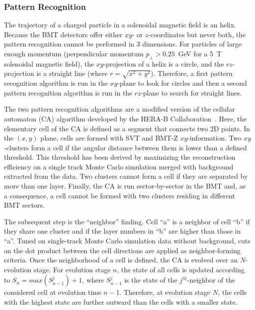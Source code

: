 \subsubsection{Pattern Recognition}

The trajectory of a charged particle in a solenoidal magnetic field is an helix. Because the BMT detectors offer
either $xy$- or $z$-coordinates but never both, the pattern recognition cannot be performed in 3 dimensions. For
particles of large enough momentum (perpendicular momentum $p_\perp > 0.25$~GeV for a 5~T solenoidal magnetic
field), the $xy$-projection of a helix is a circle, and the $rz$-projection is a straight line (where
$r = \sqrt{x^2 + y^2}$). Therefore, a first pattern recognition algorithm is run in the $xy$-plane to look for circles
and then a second pattern recognition algorithm is run in the $rz$-plane to search for straight lines.

The two pattern recognition algorithms are a modified version of the cellular automaton (CA) algorithm developed
by the HERA-B Collaboration~\cite{CA-HeraB}. Here, the elementary cell of the CA is defined as a segment that
connects two 2D points. In the $(x,y)$ plane, cells are formed with SVT and BMT-Z $xy$-information. Two
$xy$-clusters form a cell if the angular distance between them is lower than a defined threshold. This threshold
has been derived by maximizing the reconstruction efficiency on a single track Monte Carlo simulation merged with
background extracted from the data. Two clusters cannot form a cell if they are separated by more than one layer.
Finally, the CA is run sector-by-sector in the BMT and, as a consequence, a cell cannot be formed with two clusters
residing in different BMT sectors.

The subsequent step is the ``neighbor'' finding. Cell ``a'' is a neighbor of cell ``b'' if they share one cluster and
if the layer numbers in ``b'' are higher than those in ``a''. Tuned on single-track Monte Carlo simulation data
without background, cuts on the dot product between the cell directions are applied as neighbor-forming criteria.
Once the neighborhood of a cell is defined, the CA is evolved over an $N$-evolution stage. For evolution stage $n$,
the state of all cells is updated according to $S_n = max(S_{n-1}^j) + 1$, where $S_{n-1}^j$ is the state of the
$j^{th}$-neighbor of the considered cell at evolution time $n-1$. Therefore, at evolution stage $N$, the cells with
the highest state are further outward than the cells with a smaller state. 

